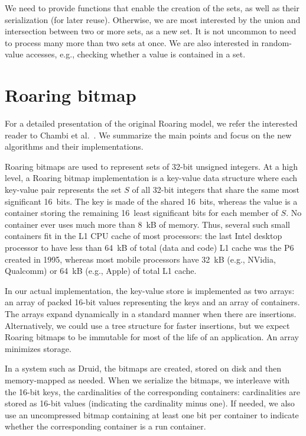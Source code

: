 \documentclass[times]{speauth}
\begin{document}
We need to provide functions that enable the creation of the
sets,
as well as their
serialization (for later reuse). Otherwise,
 we are most interested by the
union and intersection between two or more sets, as a new set.
It is not uncommon to need to process many more than two sets at once.
We are also interested in random-value accesses, e.g., checking whether a
 value is contained in a set.


\section{Roaring bitmap}\label{sec:roaring}

For a detailed presentation of the original Roaring model, we refer the interested reader to Chambi et al.~\cite{SPE:SPE2325}. We summarize the main points and focus on the new algorithms and their implementations.



Roaring bitmaps are used to represent sets of 32-bit unsigned integers. At a high level, a Roaring bitmap implementation is a key-value data structure  where each key-value pair represents the set $S$ of all 32-bit integers that share the same most significant 16~bits. The key is made of the shared 16~bits, whereas
the value is a container storing
the remaining 16~least significant bits for each member of $S$.
No container ever uses much more than \SI{8}{kB} of memory. Thus, several such small containers fit in the L1 CPU cache of most processors: the last Intel desktop processor to have less than   \SI{64}{kB} of total (data and code) L1 cache was the P6 created in 1995,
whereas most mobile processors have \SI{32}{kB} (e.g., NVidia, Qualcomm) or \SI{64}{kB} (e.g., Apple) of total L1 cache.


 In our actual implementation, the key-value store is implemented as two arrays: an array of packed 16-bit values representing the keys and   an array of containers. 
The arrays expand dynamically in a standard manner when there are insertions. Alternatively, we could use a tree structure for faster insertions, but we expect Roaring bitmaps to be immutable for most of the life of an application. An array minimizes storage. 

In a system such as Druid, the bitmaps are created, stored on disk and then memory-mapped as needed. When we serialize the bitmaps,  we interleave with the 16-bit keys, the cardinalities of the corresponding containers: cardinalities are stored as 16-bit values (indicating the cardinality minus one). 
If needed, we also use an uncompressed bitmap containing at least one bit per container to indicate whether the corresponding container is a run container. 
\end{document}
